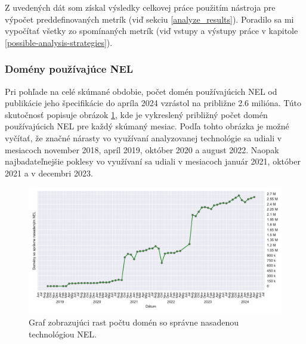 Z uvedených dát som získal výsledky celkovej práce použitím nástroja pre výpočet preddefinovaných metrík (viď sekciu \ref{analyze_results}).
Poradilo sa mi vypočítať všetky zo spomínaných metrík (viď vstupy a výstupy práce v kapitole \ref{possible-analysis-strategies}).

\subsubsection{Domény používajúce NEL}

Pri pohľade na celé skúmané obdobie, počet domén používajúcich NEL od publikácie jeho špecifikácie do apríla 2024 vzrástol na približne 2.6 milióna. 
Túto skutočnosť popisuje obrázok \ref{fig:httparchive-nel-deployment}, kde je vykreslený približný počet domén používajúcich NEL pre každý skúmaný mesiac.
Podľa tohto obrázka je možné vyčítať, že značné nárasty vo využívaní analyzovanej technológie sa udiali v mesiacoch november 2018, apríl 2019, október 2020 a august 2022.
Naopak najbadateľnejšie poklesy vo využívaní sa udiali v mesiacoch január 2021, október 2021 a v decembri 2023.

\begin{figure}[!htb]
\begin{center}
 \includegraphics[scale=0.59]{obrazky-figures/httparchive_nel_deployment.pdf}
 \caption{\centering Graf zobrazujúci rast počtu domén so správne nasadenou technológiou NEL.}
 \label{fig:httparchive-nel-deployment}
\end{center}
\end{figure}

